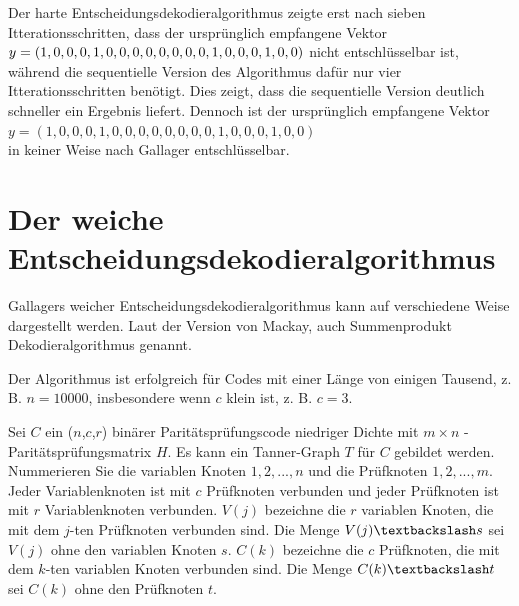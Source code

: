 \begin{Beispiel}
    Der harte Entscheidungsdekodieralgorithmus zeigte erst 
    nach sieben Itterationsschritten, 
    dass der ursprünglich empfangene Vektor\\
    $y = (1,0,0,0,1,0,0,0,0,0,0,0,0,1,0,0,0,1,0,0)\\$
    nicht entschlüsselbar ist, 
    während die sequentielle Version des Algorithmus 
    dafür nur vier Itterationsschritten benötigt.
    Dies zeigt, dass die sequentielle Version deutlich schneller 
    ein Ergebnis liefert. Dennoch ist der ursprünglich
    empfangene Vektor\\
    $y = (1,0,0,0,1,0,0,0,0,0,0,0,0,1,0,0,0,1,0,0)$\\
    in keiner Weise nach Gallager entschlüsselbar.\\    
\end{Beispiel}

\section{Der weiche Entscheidungsdekodieralgorithmus} 

\begin{Theorem}
Gallagers weicher Entscheidungsdekodieralgorithmus kann auf verschiedene Weise dargestellt werden. Laut der Version von Mackay, auch Summenprodukt Dekodieralgorithmus genannt.

Der Algorithmus ist erfolgreich für Codes mit einer Länge von einigen Tausend, z. B. $n = 10 000$, insbesondere wenn $c$ klein ist, z. B. $c = 3$.\\
\end{Theorem}

\begin{definition}
Sei $C$ ein  (\(n\),\(c\),\(r\)) binärer Paritätsprüfungscode niedriger Dichte mit $m \times n$ -Paritätsprüfungsmatrix $H$.
Es kann ein Tanner-Graph $T$ für $C$ gebildet werden.
Nummerieren Sie die variablen Knoten $1, 2, . . . , n$ und die Prüfknoten $1, 2, . . . ,m$. 
Jeder Variablenknoten ist mit $c$ Prüfknoten verbunden und jeder Prüfknoten ist mit $r$ Variablenknoten verbunden. 
$V(j)$ bezeichne die $r$ variablen Knoten, die mit dem $j$-ten Prüfknoten verbunden sind. 
Die Menge $V(j) \textbackslash s$ sei $V(j)$ ohne den variablen Knoten $s$. 
$C(k)$ bezeichne die $c$ Prüfknoten, die mit dem $k$-ten variablen Knoten verbunden sind. 
Die Menge $C(k) \textbackslash t$ sei $C(k)$ ohne den Prüfknoten $t$.\cite[S. 10]{huffman}\\
\end{definition}


